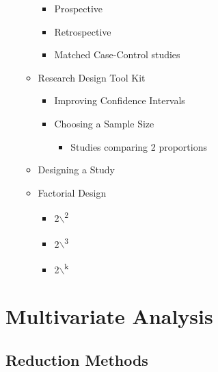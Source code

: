 \documentclass[11pt]{article}
\begin{document}
\begin{itemize}
\begin{itemize}
\begin{itemize}
\item Prospective
\item Retrospective
\item Matched Case-Control studies
\end{itemize}

\item Research Design Tool Kit

\begin{itemize}
\item Improving Confidence Intervals
\item Choosing a Sample Size

\begin{itemize}
\item Studies comparing 2 proportions
\end{itemize}
\end{itemize}

\item Designing a Study
\item Factorial Design

\begin{itemize}
\item 2$\backslash$\textsuperscript{2}
\item 2$\backslash$\textsuperscript{3}
\item 2$\backslash$\textsuperscript{k}
\end{itemize}
\end{itemize}
\end{itemize}

\section{Multivariate Analysis}
\label{sec:org18f8328}
\subsection{Reduction Methods}
\label{sec:org5225517}
\end{document}
